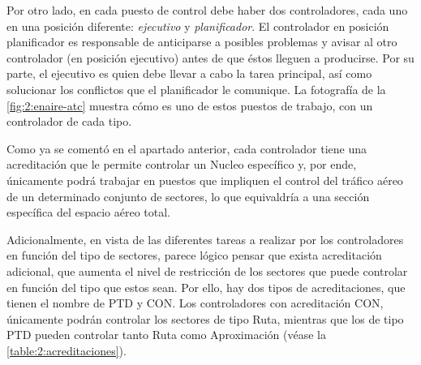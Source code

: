 Por otro lado, en cada puesto de control debe haber dos controladores, cada uno en una posición diferente: 
\textit{ejecutivo} y \textit{planificador}. El controlador en posición planificador es responsable de anticiparse a posibles problemas y avisar al otro controlador (en posición ejecutivo) antes de que éstos lleguen a producirse. Por su parte, el ejecutivo es quien debe llevar a cabo la tarea principal, así como solucionar los conflictos que el planificador le comunique. La fotografía de la \autoref{fig:2:enaire-atc} muestra cómo es uno de estos puestos de trabajo, con un controlador de cada tipo.

Como ya se comentó en el apartado anterior, cada controlador tiene una acreditación que le permite controlar un \gls{Nucleo} específico y, por ende, únicamente podrá trabajar en puestos que impliquen el control del 
tráfico aéreo de un determinado conjunto de sectores, lo que equivaldría a una sección específica del espacio aéreo total.

Adicionalmente, en vista de las diferentes tareas a realizar por los controladores en función del tipo de sectores, parece lógico pensar que exista acreditación adicional, que aumenta el nivel de restricción de los sectores que puede controlar en función del tipo que estos sean. Por ello, hay dos tipos de acreditaciones, que tienen el nombre de PTD y CON. Los controladores con acreditación CON, únicamente podrán controlar los sectores de tipo Ruta, mientras que los de tipo PTD pueden controlar tanto Ruta como Aproximación (véase la \autoref{table:2:acreditaciones}).



